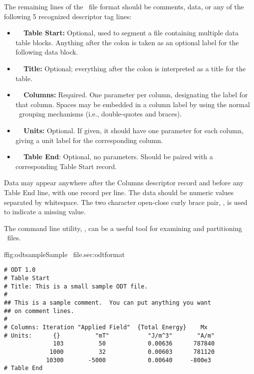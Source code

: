 The remaining lines of the \ODT\ file format should be comments,
data, or any of the following 5 recognized descriptor tag lines:
\begin{itemize}
\item {\bf\ \lb\ Table Start:} Optional, used to segment a file
   containing multiple data table blocks.  Anything after the colon is
   taken as an optional label for the following data block.
\item {\bf\ \lb\ Title:} Optional; everything after the colon is
   interpreted as a title for the table.
\item {\bf\ \lb\ Columns:} Required.  One parameter per column,
   designating the label for that column.  Spaces may be embedded in a
   column label by using the normal \Tcl\ grouping mechanisms (i.e.,
   double-quotes and braces).
\item {\bf\ \lb\ Units:} Optional.  If given, it should have one
   parameter for each column, giving a unit label for the
   corresponding column.
\item {\bf\ \lb\ Table End}: Optional, no parameters.  Should be paired
   with a corresponding Table Start record.
\end{itemize}
Data may appear anywhere after the Columns descriptor record
and before any Table End line, with one record per line.
The data should be numeric values separated by whitespace.  The two
character open-close curly brace pair, \ocb\ccb, is used to indicate
a missing value.

The command line utility, 
,
can be a useful tool for examining and partitioning \ODT\ files.

\begin{codelisting}{f}{fig:odtsample}{Sample \ODT\ file.}{sec:odtformat}
\begin{verbatim}
# ODT 1.0
# Table Start
# Title: This is a small sample ODT file.
#
## This is a sample comment.  You can put anything you want
## on comment lines.
#
# Columns: Iteration "Applied Field"  {Total Energy}    Mx
# Units:      {}          "mT"           "J/m^3"       "A/m"
              103          50            0.00636      787840
             1000          32            0.00603      781120
            10300       -5000            0.00640     -800e3
# Table End
\end{verbatim}
\end{codelisting}


